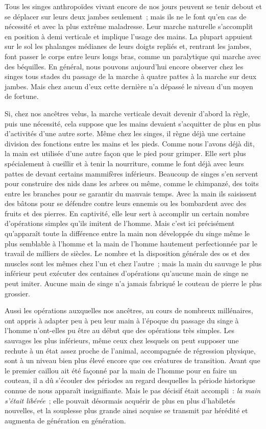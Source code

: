\documentclass[french,twoside]{book} %
\begin{document}
Tous les singes anthropoïdes vivant encore de nos jours peuvent se tenir debout et se déplacer sur leurs deux jambes seulement ; mais ils ne le font qu’en cas de nécessité et avec la plus extrême maladresse. Leur marche naturelle s’accomplit en position à demi verticale et implique l’usage des mains. La plupart appuient sur le sol les phalanges médianes de leurs doigts repliés et, rentrant les jambes, font passer le corps entre leurs longs bras, comme un paralytique qui marche avec des béquilles. En général, nous pouvons aujourd’hui encore observer chez les singes tous stades du passage de la marche à quatre pattes à la marche sur deux jambes. Mais chez aucun d’eux cette dernière n’a dépassé le niveau d’un moyen de fortune.\par
Si, chez nos ancêtres velus, la marche verticale devait devenir d’abord la règle, puis une nécessité, cela suppose que les mains devaient s’acquitter de plus en plus d’activités d’une autre sorte. Même chez les singes, il règne déjà une certaine division des fonctions entre les mains et les pieds. Comme nous l’avons déjà dit, la main est utilisée d’une autre façon que le pied pour grimper. Elle sert plus spécialement à cueillir et à tenir la nourriture, comme le font déjà avec leurs pattes de devant certains mammifères inférieurs. Beaucoup de singes s’en servent pour construire des nids dans les arbres ou même, comme le chimpanzé, des toits entre les branches pour se garantir du mauvais temps. Avec la main ils saisissent des bâtons pour se défendre contre leurs ennemis ou les bombardent avec des fruits et des pierres. En captivité, elle leur sert à accomplir un certain nombre d’opérations simples qu’ils imitent de l’homme. Mais c’est ici précisément qu’apparaît toute la différence entre la main non développée du singe même le plus semblable à l’homme et la main de l’homme hautement perfectionnée par le travail de milliers de siècles. Le nombre et la disposition générale des os et des muscles sont les mêmes chez l’un et chez l’autre ; mais la main du sauvage le plus inférieur peut exécuter des centaines d’opérations qu’aucune main de singe ne peut imiter. Aucune main de singe n’a jamais fabriqué le couteau de pierre le plus grossier.\par
Aussi les opérations auxquelles nos ancêtres, au cours de nombreux millénaires, ont appris à adapter peu à peu leur main à l’époque du passage du singe à l’homme n’ont-elles pu être au début que des opérations très simples. Les sauvages les plus inférieurs, même ceux chez lesquels on peut supposer une rechute à un état assez proche de l’animal, accompagnée de régression physique, sont à un niveau bien plus élevé encore que ces créatures de transition. Avant que le premier caillou ait été façonné par la main de l’homme pour en faire un couteau, il a dû s’écouler des périodes au regard desquelles la période historique connue de nous apparaît insignifiante. Mais le pas décisif était accompli : \emph{la main s’était libérée} ; elle pouvait désormais acquérir de plus en plus d’habiletés nouvelles, et la souplesse plus grande ainsi acquise se transmit par hérédité et augmenta de génération en génération.\par
\end{document}
